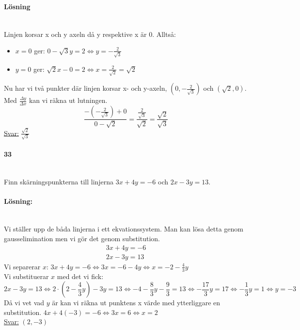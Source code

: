 \paragraph{Lösning}~\\
Linjen korsar x och y axeln då y respektive x är 0.
Alltså:
\begin{itemize}
    \item $x=0$ ger: $0-\sqrt{3}y=2\Leftrightarrow y=-\frac{2}{\sqrt{3}}$
    \item $y=0$ ger: $\sqrt{2}x-0=2\Leftrightarrow x=\frac{2}{\sqrt{2}}=\sqrt{2}$
\end{itemize}
Nu har vi två punkter där linjen korsar x- och y-axeln, $(0, -\frac{2}{\sqrt{3}})$ och $(\sqrt{2}, 0)$.
Med $\frac{\Delta y}{\Delta   x}$ kan vi räkna ut lutningen.
\begin{equation*}
    \frac{-(-\frac{2}{\sqrt{3}})+0}{0-\sqrt{2}}=
    \frac{\frac{2}{\sqrt{3}}}{\sqrt{2}}=
    \frac{\sqrt{2}}{\sqrt{3}}
\end{equation*}
\underline{Svar:} $\frac{\sqrt{2}}{\sqrt{3}}$

\paragraph{33}~\\
Finn skärningspunkterna till linjerna $3x+4y=-6$ och $2x-3y=13$.
\paragraph{Lösning:}~\\
Vi ställer upp de båda linjerna i ett ekvationssystem.
Man kan lösa detta genom gausselimination men vi gör det genom substitution.
\begin{equation*}
    \begin{matrix}
        3x+4y=-6 \\
        2x-3y=13
    \end{matrix}
\end{equation*}
Vi separerar $x$:
$3x+4y=-6\Leftrightarrow 3x=-6-4y\Leftrightarrow x=-2-\frac{4}{3}y$\\
Vi substituerar $x$ med det vi fick:
\begin{equation*}
    2x-3y=13\Leftrightarrow
    2\cdot(2-\frac{4}{3}y)-3y=13\Leftrightarrow
    -4-\frac{8}{3}y-\frac{9}{3}=13\Leftrightarrow
    -\frac{17}{3}y=17\Leftrightarrow
    -\frac{1}{3}y=1\Leftrightarrow y=-3
\end{equation*}
Då vi vet vad $y$ är kan vi räkna ut punktens x värde med ytterliggare en substitution.
$4x+4(-3)=-6\Leftrightarrow 3x=6\Leftrightarrow x=2$\\
\underline{Svar:} $(2, -3)$

